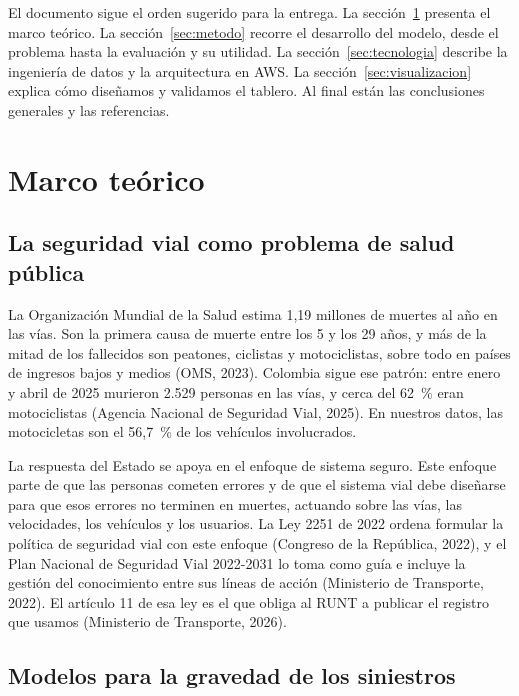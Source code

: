 \documentclass[11pt,a4paper]{article}
\begin{document}
El documento sigue el orden sugerido para la entrega. La sección~\ref{sec:marco} presenta el marco teórico. La sección~\ref{sec:metodo} recorre el desarrollo del modelo, desde el problema hasta la evaluación y su utilidad. La sección~\ref{sec:tecnologia} describe la ingeniería de datos y la arquitectura en AWS. La sección~\ref{sec:visualizacion} explica cómo diseñamos y validamos el tablero. Al final están las conclusiones generales y las referencias.

\section{Marco teórico}\label{sec:marco}

\subsection{La seguridad vial como problema de salud pública}

La Organización Mundial de la Salud estima 1,19 millones de muertes al año en las vías. Son la primera causa de muerte entre los 5 y los 29 años, y más de la mitad de los fallecidos son peatones, ciclistas y motociclistas, sobre todo en países de ingresos bajos y medios (OMS, 2023). Colombia sigue ese patrón: entre enero y abril de 2025 murieron 2.529 personas en las vías, y cerca del 62~\% eran motociclistas (Agencia Nacional de Seguridad Vial, 2025). En nuestros datos, las motocicletas son el 56,7~\% de los vehículos involucrados.

La respuesta del Estado se apoya en el enfoque de sistema seguro. Este enfoque parte de que las personas cometen errores y de que el sistema vial debe diseñarse para que esos errores no terminen en muertes, actuando sobre las vías, las velocidades, los vehículos y los usuarios. La Ley 2251 de 2022 ordena formular la política de seguridad vial con este enfoque (Congreso de la República, 2022), y el Plan Nacional de Seguridad Vial 2022-2031 lo toma como guía e incluye la gestión del conocimiento entre sus líneas de acción (Ministerio de Transporte, 2022). El artículo 11 de esa ley es el que obliga al RUNT a publicar el registro que usamos (Ministerio de Transporte, 2026).

\subsection{Modelos para la gravedad de los siniestros}
\end{document}
